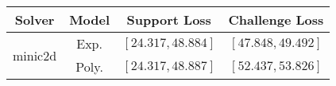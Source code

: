 \begin{tabular}{cc|c|c} 
\hline 
 Solver & Model & Support Loss  & Challenge Loss \tabularnewline\hline 
\hline 
\multirow{2}{*}{minic2d} & Exp. & $\mathbf{\left[24.317,48.884\right]}$ & $\mathbf{\left[47.848,49.492\right]}$ \tabularnewline 
 & Poly. & $\left[24.317,48.887\right]$ & $\left[52.437,53.826\right]$ \tabularnewline 
\hline 
\end{tabular} 

